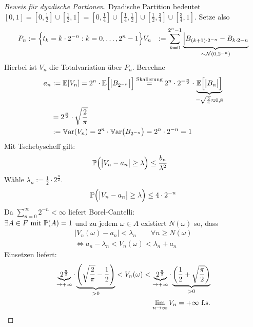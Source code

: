 \begin{proof}[Beweis für dyadische Partionen]\enter
	Dyadische Partition bedeutet $[0,1]=[0,\frac{1}{2}]\cup[\frac{1}{2},1]=[0,\frac{1}{4}]\cup[\frac{1}{4},\frac{1}{2}]\cup[\frac{1}{2},\frac{3}{4}]\cup[\frac{3}{4},1]$.
	Setze also 
	\begin{align*}
		P_n&:=\Big\lbrace t_k=k\cdot 2^{-n}:k=0,\ldots,2^{n}-1\Big\rbrace
		V_n&:=\sum\limits_{k=0}^{2^n-1}\underbrace{\Big|B_{(k+1)\cdot 2^{-n}}-B_{k\cdot 2{-n}}}_{\sim\Nor(0,2^{-n})}
	\end{align*}
	Hierbei ist $V_n$ die Totalvariation über $P_n$.
	Berechne
	\begin{align*}
		a_n&:=\E[V_n]
		=2^n\cdot\E\Big[\big|B_{2^{-n}}\big|\Big]
		\overset{\text{Skalierung}}=
		2^n\cdot 2^{-\frac{n}{2}}\cdot\underbrace{\E\Big[\big|B_n\big|\Big]}_{=\sqrt{\frac{2}{\pi}}\approx0,8}\\
		&=2^{\frac{n}{2}}\cdot\sqrt{\frac{2}{\pi}}\\
		&:=\Var(V_n)
		=2^n\cdot\Var\big(B_{2^{-n}}\big)
		=2^n\cdot 2^{-n}
		=1
	\end{align*}
	Mit Tschebyscheff gilt:
	\begin{align*}
		\P\Big(\big|V_n-a_n\big|\geq\lambda\Big)
		&\leq\frac{b_n}{\lambda^2}
	\end{align*}
	Wähle $\lambda_n:=\frac{1}{2}\cdot 2^{\frac{n}{2}}$.
	\begin{align*}
		\P\Big(\big|V_n-a_n\big|\geq\lambda\Big)\leq 4\cdot 2^{-n}
	\end{align*}
	Da $\sum\limits_{n=0}^\infty 2^{-n}<\infty$ liefert Borel-Cantelli:\\
	$\exists A\in F\mit\P(A)=1$ und zu jedem $\omega\in A$ existiert $N(\omega)$ so, dass
	\begin{align*}
		\big|V_n(\omega)-a_n\big|<\lambda_n\qquad\forall n\geq N(\omega)\\
		\Longleftrightarrow a_n-\lambda_n<V_n(\omega)<\lambda_n+a_n
	\end{align*}
	Einsetzen liefert:
	\begin{align*}
		\underbrace{2^{\frac{n}{2}}}_{\to+\infty}\cdot\underbrace{\left(\sqrt{\frac{2}{\pi}}-\frac{1}{2}\right)}_{>0}<V_n(\omega)<\underbrace{2^{\frac{n}{2}}}_{\to+\infty}\cdot\underbrace{\left(\frac{1}{2}+\sqrt{\frac{\pi}{2}}\right)}_{>0}\\
		\limn V_n=+\infty\text{ f.s.}
	\end{align*}
\end{proof}

